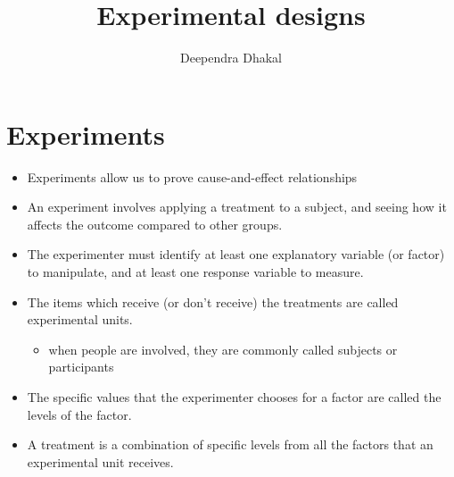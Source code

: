 \documentclass[
  ignorenonframetext,
  aspectratio=169]{beamer}
\title{Experimental designs}
\author{Deependra Dhakal}
\date{}
\institute{Assistant Professor \and Agriculture and Forestry
University \and \url{https://rookie.rbind.io}}
\providecommand{\tightlist}{%
  \setlength{\itemsep}{0pt}\setlength{\parskip}{0pt}}
\begin{document}
\frame{\titlepage}

\begin{frame}[allowframebreaks]
  \tableofcontents[hideallsubsections]
\end{frame}
\hypertarget{experiments}{%
\section{Experiments}\label{experiments}}

\begin{frame}{}
\protect\hypertarget{section}{}
\begin{itemize}
\tightlist
\item
  Experiments allow us to prove cause-and-effect relationships
\item
  An experiment involves applying a treatment to a subject, and seeing
  how it affects the outcome compared to other groups.
\item
  The experimenter must identify at least one explanatory variable (or
  factor) to manipulate, and at least one response variable to measure.
\item
  The items which receive (or don't receive) the treatments are called
  experimental units.

  \begin{itemize}
  \tightlist
  \item
    when people are involved, they are commonly called subjects or
    participants
  \end{itemize}
\item
  The specific values that the experimenter chooses for a factor are
  called the levels of the factor.
\item
  A treatment is a combination of specific levels from all the factors
  that an experimental unit receives.
\end{itemize}
\end{frame}
\end{document}
